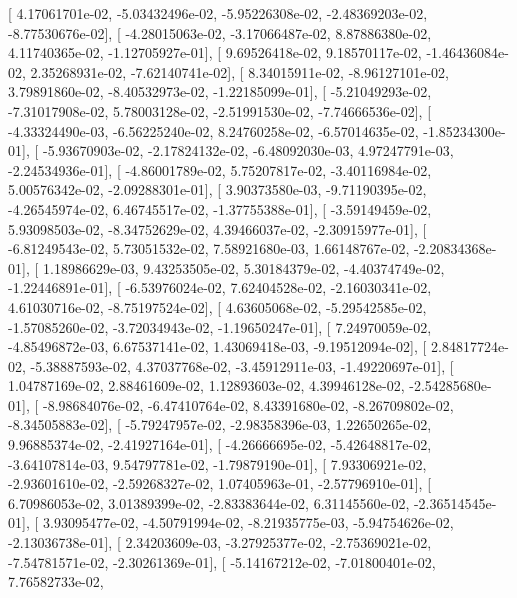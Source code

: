 \documentclass{article}
\begin{document}
       [  4.17061701e-02,  -5.03432496e-02,  -5.95226308e-02,
         -2.48369203e-02,  -8.77530676e-02],
       [ -4.28015063e-02,  -3.17066487e-02,   8.87886380e-02,
          4.11740365e-02,  -1.12705927e-01],
       [  9.69526418e-02,   9.18570117e-02,  -1.46436084e-02,
          2.35268931e-02,  -7.62140741e-02],
       [  8.34015911e-02,  -8.96127101e-02,   3.79891860e-02,
         -8.40532973e-02,  -1.22185099e-01],
       [ -5.21049293e-02,  -7.31017908e-02,   5.78003128e-02,
         -2.51991530e-02,  -7.74666536e-02],
       [ -4.33324490e-03,  -6.56225240e-02,   8.24760258e-02,
         -6.57014635e-02,  -1.85234300e-01],
       [ -5.93670903e-02,  -2.17824132e-02,  -6.48092030e-03,
          4.97247791e-03,  -2.24534936e-01],
       [ -4.86001789e-02,   5.75207817e-02,  -3.40116984e-02,
          5.00576342e-02,  -2.09288301e-01],
       [  3.90373580e-03,  -9.71190395e-02,  -4.26545974e-02,
          6.46745517e-02,  -1.37755388e-01],
       [ -3.59149459e-02,   5.93098503e-02,  -8.34752629e-02,
          4.39466037e-02,  -2.30915977e-01],
       [ -6.81249543e-02,   5.73051532e-02,   7.58921680e-03,
          1.66148767e-02,  -2.20834368e-01],
       [  1.18986629e-03,   9.43253505e-02,   5.30184379e-02,
         -4.40374749e-02,  -1.22446891e-01],
       [ -6.53976024e-02,   7.62404528e-02,  -2.16030341e-02,
          4.61030716e-02,  -8.75197524e-02],
       [  4.63605068e-02,  -5.29542585e-02,  -1.57085260e-02,
         -3.72034943e-02,  -1.19650247e-01],
       [  7.24970059e-02,  -4.85496872e-03,   6.67537141e-02,
          1.43069418e-03,  -9.19512094e-02],
       [  2.84817724e-02,  -5.38887593e-02,   4.37037768e-02,
         -3.45912911e-03,  -1.49220697e-01],
       [  1.04787169e-02,   2.88461609e-02,   1.12893603e-02,
          4.39946128e-02,  -2.54285680e-01],
       [ -8.98684076e-02,  -6.47410764e-02,   8.43391680e-02,
         -8.26709802e-02,  -8.34505883e-02],
       [ -5.79247957e-02,  -2.98358396e-03,   1.22650265e-02,
          9.96885374e-02,  -2.41927164e-01],
       [ -4.26666695e-02,  -5.42648817e-02,  -3.64107814e-03,
          9.54797781e-02,  -1.79879190e-01],
       [  7.93306921e-02,  -2.93601610e-02,  -2.59268327e-02,
          1.07405963e-01,  -2.57796910e-01],
       [  6.70986053e-02,   3.01389399e-02,  -2.83383644e-02,
          6.31145560e-02,  -2.36514545e-01],
       [  3.93095477e-02,  -4.50791994e-02,  -8.21935775e-03,
         -5.94754626e-02,  -2.13036738e-01],
       [  2.34203609e-03,  -3.27925377e-02,  -2.75369021e-02,
         -7.54781571e-02,  -2.30261369e-01],
       [ -5.14167212e-02,  -7.01800401e-02,   7.76582733e-02,
\end{document}
